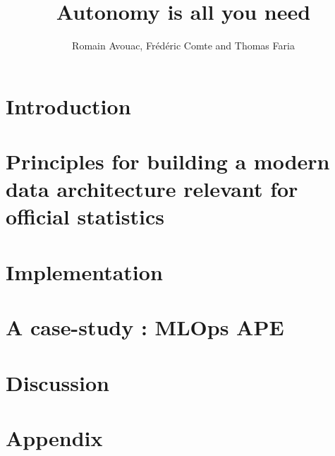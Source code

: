 \documentclass[graybox]{svmult}
\begin{document}
\title*{Autonomy is all you need}
\author{Romain Avouac, Frédéric Comte and Thomas Faria}
%
%
\maketitle



\section{Introduction}
\label{sec:1}


\section{Principles for building a modern data architecture relevant for official statistics}
\label{sec:2}


\section{Implementation}
\label{sec:3}


\section{A case-study : MLOps APE}
\label{sec:4}


\section{Discussion}
\label{sec:5}


\section*{Appendix}
%
%



\end{document}
